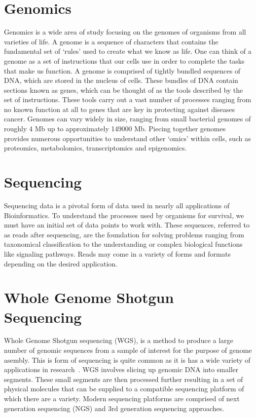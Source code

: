 \section{Genomics}
Genomics is a wide area of study focusing on the genomes of organisms
from all varieties of life. A genome is a sequence of characters that
contains the fundamental set of `rules' used to create what we know as
life. One can think of a genome as a set of instructions that our
cells use in order to complete the tasks that make us function. A
genome is comprised of tightly bundled sequences of DNA, which are
stored in the nucleus of cells. These bundles of DNA contain sections
known as genes, which can be thought of as the tools described by the
set of instructions. These tools carry out a vast number of processes
ranging from no known function at all to genes that are key in
protecting against diseases cancer. Genomes can vary widely in size,
ranging from small bacterial genomes of roughly 4 Mb up to
approximately 149000 Mb. Piecing together genomes provides numerous
opportunities to understand other `omics' within cells, such as
proteomics, metabolomics, transcriptomics and epigenomics.

\section{Sequencing}
Sequencing data is a pivotal form of data used in nearly all
applications of Bioinformatics. To understand the processes used by
organisms for survival, we must have an initial set of data points to
work with. These sequences, referred to as reads after sequencing, are
the foundation for solving problems ranging from taxonomical
classification to the understanding or complex biological functions
like signaling pathways. Reads may come in a variety of forms and
formats depending on the desired application.

\section{Whole Genome Shotgun Sequencing}
Whole Genome Shotgun sequencing (WGS), is a method to produce a large
number of genomic sequences from a sample of interest for the purpose
of genome asembly. This is form of sequencing is quite common as it is
has a wide variety of applications in research~\cite{Adams2008}. WGS
involves slicing up genomic DNA into smaller segments. These small
segments are then processed further resulting in a set of physical
molecules that can be supplied to a compatible sequencing platform of
which there are a variety. Modern sequencing platforms are comprised
of next generation sequencing (NGS) and 3rd generation sequencing
approaches.

